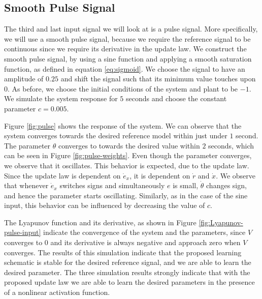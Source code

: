 \subsection{Smooth Pulse Signal}
The third and last input signal we will look at is a pulse signal. More specifically, we will use a smooth pulse signal, because we require the reference signal to be continuous since we require its derivative in the update law. We construct the smooth pulse signal, by using a sine function and applying a smooth saturation function, as defined in equation \eqref{eq:sigmoid}. We choose the signal to have an amplitude of $0.25$ and shift the signal such that its minimum value touches upon $0$. As before, we choose the initial conditions of the system and plant to be $-1$. We simulate the system response for $5$ seconds and choose the constant parameter $c=0.005$.

Figure \ref{fig:pulse} shows the response of the system. We can observe that the system converges towards the desired reference model within just under $1$ second. The parameter $\theta$ converges to towards the desired value within $2$ seconds, which can be seen in Figure \ref{fig:pulse-weights}. Even though the parameter converges, we observe that it oscillates. This behavior is expected, due to the update law. Since the update law is dependent on $\dot e_x$, it is dependent on $\dot r$ and $\dot x$. We observe that whenever $\dot e_x$ switches signs and simultaneously $e$ is small, $\dot \theta$ changes sign, and hence the parameter starts oscillating. Similarly, as in the case of the sine input, this behavior can be influenced by decreasing the value of $c$.

The Lyapunov function and its derivative, as shown in Figure \ref{fig:Lyapunov-pulse-input} indicate the convergence of the system and the parameters, since $V$ converges to $0$ and its derivative is always negative and approach zero when $V$ converges. The results of this simulation indicate that the proposed learning schematic is stable for the desired reference signal, and we are able to learn the desired parameter. The three simulation results strongly indicate that with the proposed update law we are able to learn the desired parameters in the presence of a nonlinear activation function.

